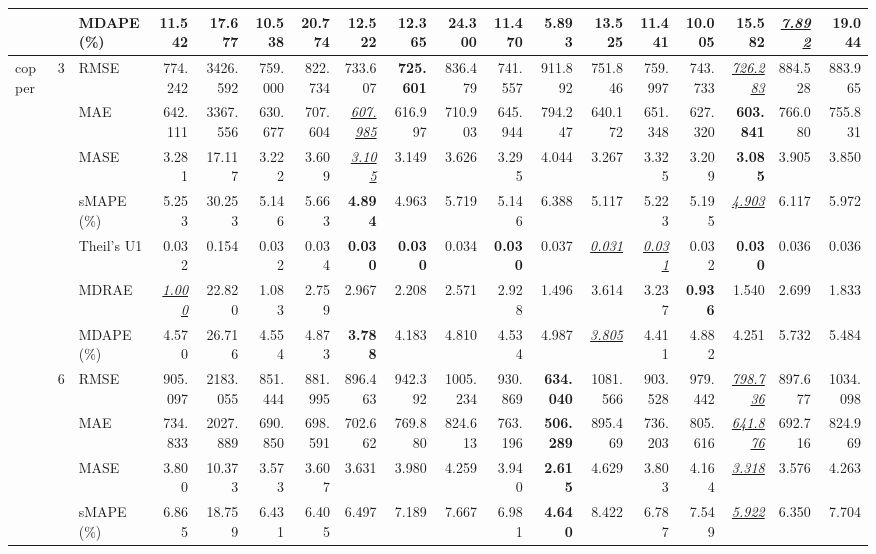 \begin{table}[!htbp]
{\begin{tabular}{lllrrrrrrrrrrrrrrr}
 &  & MDAPE (\%) & 11.542 & 17.677 & 10.538 & 20.774 & 12.522 & 12.365 & 24.300 & 11.470 & \textbf{5.893} & 13.525 & 11.441 & 10.005 & 15.582 & \underline{\textit{7.892}} & 19.044 \\
\midrule
copper & 3 & RMSE & 774.242 & 3426.592 & 759.000 & 822.734 & 733.607 & \textbf{725.601} & 836.479 & 741.557 & 911.892 & 751.846 & 759.997 & 743.733 & \underline{\textit{726.283}} & 884.528 & 883.965 \\
 &  & MAE & 642.111 & 3367.556 & 630.677 & 707.604 & \underline{\textit{607.985}} & 616.997 & 710.903 & 645.944 & 794.247 & 640.172 & 651.348 & 627.320 & \textbf{603.841} & 766.080 & 755.831 \\
 &  & MASE & 3.281 & 17.117 & 3.222 & 3.609 & \underline{\textit{3.105}} & 3.149 & 3.626 & 3.295 & 4.044 & 3.267 & 3.325 & 3.209 & \textbf{3.085} & 3.905 & 3.850 \\
 &  & sMAPE (\%) & 5.253 & 30.253 & 5.146 & 5.663 & \textbf{4.894} & 4.963 & 5.719 & 5.146 & 6.388 & 5.117 & 5.223 & 5.195 & \underline{\textit{4.903}} & 6.117 & 5.972 \\
 &  & Theil's U1 & 0.032 & 0.154 & 0.032 & 0.034 & \textbf{0.030} & \textbf{0.030} & 0.034 & \textbf{0.030} & 0.037 & \underline{\textit{0.031}} & \underline{\textit{0.031}} & 0.032 & \textbf{0.030} & 0.036 & 0.036 \\
 &  & MDRAE & \underline{\textit{1.000}} & 22.820 & 1.083 & 2.759 & 2.967 & 2.208 & 2.571 & 2.928 & 1.496 & 3.614 & 3.237 & \textbf{0.936} & 1.540 & 2.699 & 1.833 \\
 &  & MDAPE (\%) & 4.570 & 26.716 & 4.554 & 4.873 & \textbf{3.788} & 4.183 & 4.810 & 4.534 & 4.987 & \underline{\textit{3.805}} & 4.411 & 4.882 & 4.251 & 5.732 & 5.484 \\
\cmidrule(lr){2-18}
 & 6 & RMSE & 905.097 & 2183.055 & 851.444 & 881.995 & 896.463 & 942.392 & 1005.234 & 930.869 & \textbf{634.040} & 1081.566 & 903.528 & 979.442 & \underline{\textit{798.736}} & 897.677 & 1034.098 \\
 &  & MAE & 734.833 & 2027.889 & 690.850 & 698.591 & 702.662 & 769.880 & 824.613 & 763.196 & \textbf{506.289} & 895.469 & 736.203 & 805.616 & \underline{\textit{641.876}} & 692.716 & 824.969 \\
 &  & MASE & 3.800 & 10.373 & 3.573 & 3.607 & 3.631 & 3.980 & 4.259 & 3.940 & \textbf{2.615} & 4.629 & 3.803 & 4.164 & \underline{\textit{3.318}} & 3.576 & 4.263 \\
 &  & sMAPE (\%) & 6.865 & 18.759 & 6.431 & 6.405 & 6.497 & 7.189 & 7.667 & 6.981 & \textbf{4.640} & 8.422 & 6.787 & 7.549 & \underline{\textit{5.922}} & 6.350 & 7.704 \\

\end{tabular}}
\end{table}
